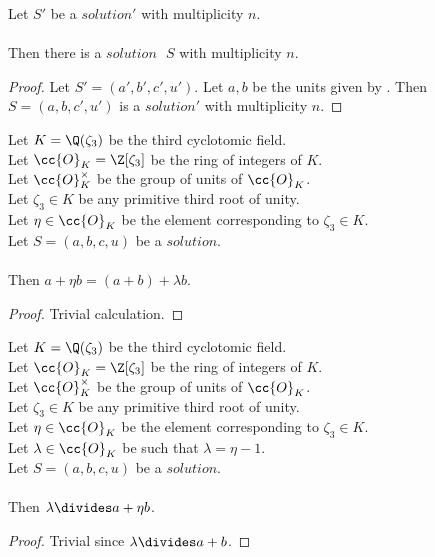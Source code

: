 \begin{lemma}
  \label{lmm:exists_Solution_of_Solution1}
  \leanok
  Let $S'$ be a $solution'$ with multiplicity $n$.\\\\
  Then there is a $solution\text{ }S$ with multiplicity $n$.
\end{lemma}
\begin{proof}
  \leanok
  Let $S'=(a',b',c',u')$. Let $a, b$ be the units given by .
  Then $S=(a,b,c',u')$ is a $solution'$ with multiplicity $n$.
\end{proof}

\begin{lemma}
  \label{lmm:a_add_eta_b}
  \leanok
  Let $K = \Q(\zeta_3)$ be the third cyclotomic field. \\
  Let $\cc{O}_K = \Z[\zeta_3]$ be the ring of integers of $K$. \\
  Let $\cc{O}^\times_K$ be the group of units of $\cc{O}_K$. \\
  Let $\zeta_3 \in K$ be any primitive third root of unity. \\
  Let $\eta \in \cc{O}_K$ be the element corresponding to $\zeta_3 \in K$. \\
  Let $S=(a, b, c, u)$ be a $solution$.\\\\
  Then $a + \eta  b = (a + b) + \lambda  b$.
\end{lemma}
\begin{proof}
  \leanok
  Trivial calculation.
\end{proof}

\begin{lemma}
  \label{lmm:lambda_dvd_a_add_eta_mul_b}
  \leanok
  Let $K = \Q(\zeta_3)$ be the third cyclotomic field. \\
  Let $\cc{O}_K = \Z[\zeta_3]$ be the ring of integers of $K$. \\
  Let $\cc{O}^\times_K$ be the group of units of $\cc{O}_K$. \\
  Let $\zeta_3 \in K$ be any primitive third root of unity. \\
  Let $\eta \in \cc{O}_K$ be the element corresponding to $\zeta_3 \in K$. \\
  Let $\lambda \in \cc{O}_K$ be such that $\lambda = \eta -1$. \\
  Let $S=(a, b, c, u)$ be a $solution$.\\\\
  Then $\lambda \divides a + \eta  b$.
\end{lemma}
\begin{proof}
  \leanok
  Trivial since $\lambda \divides a+b$.
\end{proof}

